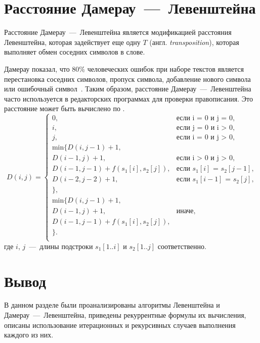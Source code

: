\section{Расстояние Дамерау~---~Левенштейна}
Расстояние Дамерау~---~Левенштейна является модификацией расстояния Левенштейна, которая задействует еще одну  $T$ (англ. \textit{transposition}), которая выполняет обмен соседних символов в слове.

Дамерау показал, что 80\% человеческих ошибок при наборе текстов является перестановка соседних символов, пропуск символа, добавление нового символа или ошибочный символ~\cite{damerau_levenshtein}. Таким образом, расстояние Дамерау~---~Левенштейна часто используется в редакторских программах для проверки правописания.
Это расстояние может быть вычислено по .
\begin{equation}
	\label{eq:damerau_levenshtein}
	D(i, j) = 
	\begin{cases}
		0, &\text{если i = 0 и j = 0,}\\
		i, &\text{если j = 0 и i > 0,}\\
		j, &\text{если i = 0 и j > 0,}\\
		\text{min} \lbrace
		D(i, j - 1) + 1,\\
		D(i - 1, j) + 1, &\text{если i > 0 и j > 0,} \\
		D(i - 1, j - 1) + f(s_{1}[i], s_{2}[j]), &\text{если $s_1[i]$ = $s_2[j - 1]$,}\\
		D(i - 2, j - 2) + 1,  &\text{если $s_1[i - 1]$ = $s_2[j]$,}\\
		\rbrace, \\
		\text{min} \lbrace
		D(i, j - 1) + 1,\\
		D(i - 1, j) + 1, &\text{иначе,}\\
		D(i - 1, j - 1) + f(s_{1}[i], s_{2}[j]), \\
		\rbrace.\\
	\end{cases}
\end{equation}
где $i$, $j$~---~длины подстроки $s_{1}[1..i]$ и $s_{2}[1..j]$ соответственно.

\section*{Вывод}
В данном разделе были проанализированы алгоритмы Левенштейна и Дамерау~---~Левенштейна, приведены рекуррентные формулы их вычисления, описаны использование итерационных и рекурсивных случаев выполнения каждого из них.